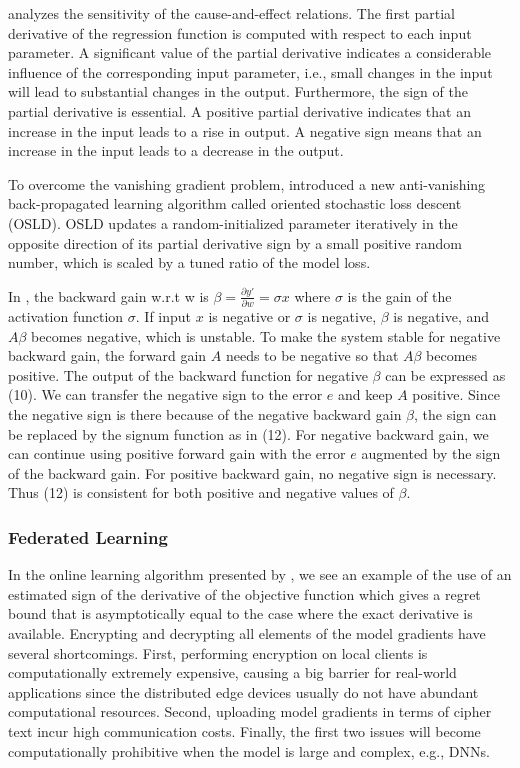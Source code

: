 \documentclass[11pt]{book}
\begin{document}
\cite{gramsch2020analysis} analyzes the sensitivity of the cause-and-effect
relations. The first partial derivative of the regression function
is computed with respect to each input parameter. A significant value
of the partial derivative indicates a considerable influence of the
corresponding input parameter, i.e., small changes in the input will
lead to substantial changes in the output. Furthermore, the sign of
the partial derivative is essential. A positive partial derivative
indicates that an increase in the input leads to a rise in output.
A negative sign means that an increase in the input leads to a decrease
in the output.

To overcome the vanishing gradient problem, \cite{abuqaddom2021oriented}
introduced a new anti-vanishing back-propagated learning algorithm
called oriented stochastic loss descent (OSLD). OSLD updates a random-initialized
parameter iteratively in the opposite direction of its partial derivative
sign by a small positive random number, which is scaled by a tuned
ratio of the model loss.

In \cite{hasan2021training}, the backward gain w.r.t w is $\beta=\frac{\partial y'}{\partial w}=\sigma x$
where $\sigma$ is the gain of the activation function $\sigma$.
If input $x$ is negative or $\sigma$ is negative, $\beta$ is negative,
and $A\beta$ becomes negative, which is unstable. To make the system
stable for negative backward gain, the forward gain $A$ needs to
be negative so that $A\beta$ becomes positive. The output of the
backward function for negative $\beta$ can be expressed as (10).
We can transfer the negative sign to the error $e$ and keep $A$
positive. Since the negative sign is there because of the negative
backward gain $\beta$, the sign can be replaced by the signum function
as in (12). For negative backward gain, we can continue using positive
forward gain with the error $e$ augmented by the sign of the backward
gain. For positive backward gain, no negative sign is necessary. Thus
(12) is consistent for both positive and negative values of $\beta$.

\subsubsection{Federated Learning}

In the online learning algorithm presented by \cite{han2020adaptive},
we see an example of the use of an estimated sign of the derivative
of the objective function which gives a regret bound that is asymptotically
equal to the case where the exact derivative is available. Encrypting
and decrypting all elements of the model gradients have several shortcomings.
First, performing encryption on local clients is computationally extremely
expensive, causing a big barrier for real-world applications since
the distributed edge devices usually do not have abundant computational
resources. Second, uploading model gradients in terms of cipher text
incur high communication costs. Finally, the first two issues will
become computationally prohibitive when the model is large and complex,
e.g., DNNs.
\end{document}
